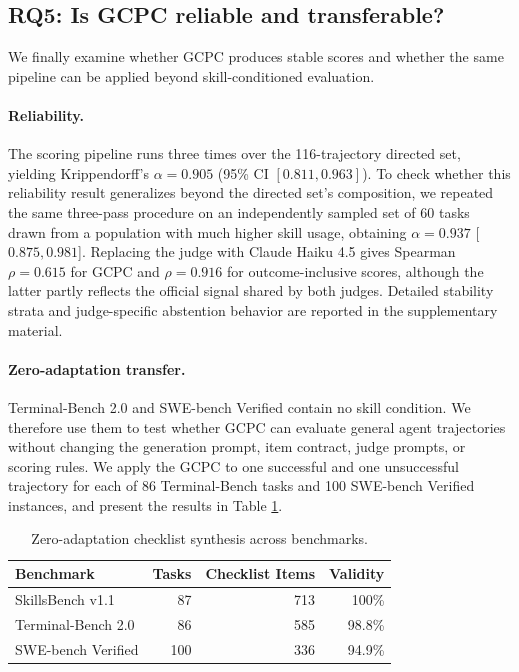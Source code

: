 \documentclass[sigconf,nonacm]{acmart}
\begin{document}
\subsection{RQ5: Is GCPC reliable and transferable?}
We finally examine whether GCPC produces stable scores and whether the same
pipeline can be applied beyond skill-conditioned evaluation.

\label{sec:reliability}

\paragraph{Reliability.}
The scoring pipeline runs three times over the 116-trajectory directed set, yielding Krippendorff's $\alpha=0.905$ (95\% CI $[0.811,0.963]$). To check whether this
reliability result generalizes beyond the directed set's composition, we
repeated the same three-pass procedure on an independently sampled set of 60
tasks drawn from a population with much higher skill usage, obtaining
$\alpha=0.937$ [$0.875,0.981$]. Replacing the judge
with Claude Haiku 4.5 gives Spearman $\rho=0.615$ for GCPC and
$\rho=0.916$ for outcome-inclusive scores, although the latter partly reflects the
official signal shared by both judges. Detailed stability strata and
judge-specific abstention behavior are reported in the supplementary
material.


\paragraph{Zero-adaptation transfer.}
Terminal-Bench 2.0 \citep{merrill2026terminalbench} and SWE-bench Verified
\citep{jimenez2024swebench} contain no skill condition. We therefore use them
to test whether GCPC can evaluate general agent trajectories without changing
the generation prompt, item contract, judge prompts, or scoring rules. We
apply the GCPC to one successful and one unsuccessful trajectory for each of 86 Terminal-Bench tasks and 100 SWE-bench Verified
instances, and present the results in Table \ref{tab:crossbench-main}.

\begin{table}[t]
\centering
\small
\caption{Zero-adaptation checklist synthesis across benchmarks.}
\label{tab:crossbench-main}
\begin{tabular}{@{}lrrr@{}}
\toprule
Benchmark & Tasks & Checklist Items & Validity \\
\midrule
SkillsBench v1.1      & 87  & 713 & 100\% \\
Terminal-Bench 2.0    & 86  & 585 & 98.8\% \\
SWE-bench Verified    & 100 & 336 & 94.9\% \\
\bottomrule
\end{tabular}
\end{table}
\end{document}

